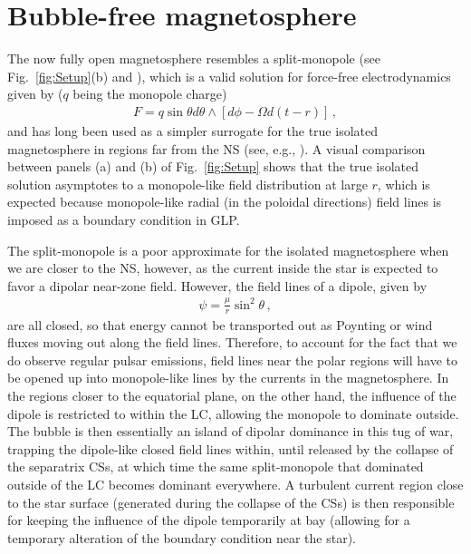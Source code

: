 \documentclass{aa}
\newcommand{\bea}{\begin{eqnarray}}
\newcommand{\eea}{\end{eqnarray}}
\begin{document}
\section{Bubble-free magnetosphere} \label{sec:EnergyEstimate}
The now fully open magnetosphere resembles a split-monopole (see Fig.~\ref{fig:Setup}(b) and \cite{Michel1974,Gralla:2014yja}), which is a valid solution for force-free electrodynamics given by ($q$ being the monopole charge)
\bea \label{eq:Monopole}
F = q \sin\theta d\theta \wedge [d\phi -\Omega d(t-r)]\,,
\eea
and has long been used as a simpler surrogate for the true isolated magnetosphere in regions far from the NS (see, e.g., \cite{Brennan:2013ppa}). A visual comparison between panels (a) and (b) of Fig.~\ref{fig:Setup} shows that the true isolated solution asymptotes to a monopole-like field distribution at large $r$, which is expected because monopole-like radial (in the poloidal directions) field lines is imposed as a boundary condition in GLP. 

The split-monopole is a poor approximate for the isolated magnetosphere when we are closer to the NS, however, as the current inside the star is expected to favor a dipolar near-zone field. However, the field lines of a dipole, given by 
\bea \label{eq:Dipole}
\psi = \frac{\mu}{r} \sin^2\theta\,, 
\eea
are all closed, so that energy cannot be transported out as Poynting or wind fluxes moving out along the field lines. Therefore, to account for the fact that we do observe regular pulsar emissions, field lines near the polar regions will have to be opened up into monopole-like lines by the currents in the magnetosphere. In the regions closer to the equatorial plane, on the other hand, the influence of the dipole is restricted to within the LC, allowing the monopole to dominate outside. 
The bubble is then essentially an island of dipolar dominance in this tug of war, trapping the dipole-like closed field lines within, until released by the collapse of the separatrix CSs, at which time the same split-monopole that dominated outside of the LC becomes dominant everywhere. A turbulent current region close to the star surface (generated during the collapse of the CSs) is then responsible for keeping the influence of the dipole temporarily at bay (allowing for a temporary alteration of the boundary condition near the star). 
\end{document}
